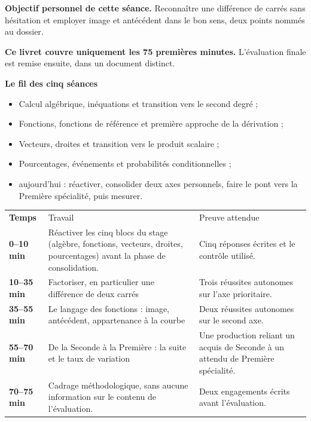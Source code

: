 \documentclass[10pt,a4paper]{article}
\begin{document}
\begin{goalbox}
\textbf{Objectif personnel de cette séance.} Reconnaître une différence de carrés sans hésitation et employer image et antécédent dans le bon sens, deux points nommés au dossier.
\par\medskip
\textbf{Ce livret couvre uniquement les 75 premières minutes.} L'évaluation finale est remise ensuite, dans un document distinct.
\end{goalbox}
\begin{methodbox}
\textbf{Le fil des cinq séances}
\begin{itemize}[leftmargin=13mm,labelsep=3mm,itemsep=1.5pt]
\item[\textbf{\color{Navy}S1}] Calcul algébrique, inéquations et transition vers le second degré ;
\item[\textbf{\color{Navy}S2}] Fonctions, fonctions de référence et première approche de la dérivation ;
\item[\textbf{\color{Navy}S3}] Vecteurs, droites et transition vers le produit scalaire ;
\item[\textbf{\color{Navy}S4}] Pourcentages, événements et probabilités conditionnelles ;
\item[\textbf{\color{Navy}S5}] aujourd'hui : réactiver, consolider deux axes personnels, faire le pont vers la Première spécialité, puis mesurer.
\end{itemize}
\end{methodbox}
\par\noindent\begin{tabularx}{\linewidth}{>{\bfseries}p{20mm} X X}
\rowcolor{Navy}\color{white}Temps & \color{white}Travail & \color{white}Preuve attendue \\
0--10 min & Réactiver les cinq blocs du stage (algèbre, fonctions, vecteurs, droites, pourcentages) avant la phase de consolidation. & Cinq réponses écrites et le contrôle utilisé. \\
10--35 min & Factoriser, en particulier une différence de deux carrés & Trois réussites autonomes sur l'axe prioritaire. \\
35--55 min & Le langage des fonctions : image, antécédent, appartenance à la courbe & Deux réussites autonomes sur le second axe. \\
55--70 min & De la Seconde à la Première : la suite et le taux de variation & Une production reliant un acquis de Seconde à un attendu de Première spécialité. \\
70--75 min & Cadrage méthodologique, sans aucune information sur le contenu de l'évaluation. & Deux engagements écrits avant l'évaluation. \\
\end{tabularx}
\end{document}
